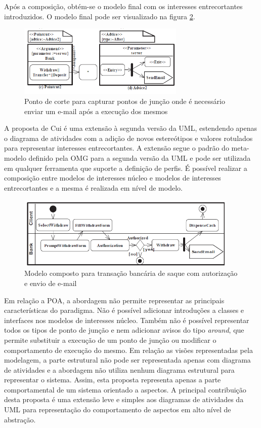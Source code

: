 Após a composição, obtém-se o modelo final com os interesses entrecortantes introduzidos. O modelo final pode ser visualizado na figura
\ref{fig:withdraw_final}.

\begin{figure}[!t]
	\centering
	\includegraphics[width=300px]{img/withdraw_2.png}
	\caption{Ponto de corte para capturar pontos de junção onde é necessário
	enviar um e-mail após a execução dos mesmos}\label{fig:withdraw_2}
\end{figure}

A proposta de Cui é uma extensão à segunda versão da UML, estendendo apenas o diagrama de atividades com a adição de novos estereótipos e valores
rotulados para representar interesses entrecortantes. A extensão segue o padrão do meta-modelo definido pela OMG para a segunda versão da UML e 
pode ser utilizada em qualquer ferramenta que suporte a definição de perfis. É possível realizar a composição entre modelos de interesses núcleo e
modelos de interesses entrecortantes e a mesma é realizada em nível de modelo.

\begin{figure}
	\centering
	\includegraphics[width=400px]{img/withdraw_final.png}
	\caption{Modelo composto para transação bancária de
	saque com autorização e envio de e-mail}\label{fig:withdraw_final}
\end{figure}

Em relação a POA, a abordagem não permite representar as principais características do paradigma. Não é possível adicionar introduções a classes e
interfaces nos modelos de interesses núcleo. Também não é possível representar todos os tipos de ponto de junção e nem adicionar avisos do tipo \textit{around}, que permite
substituir a execução de um ponto de junção ou modificar o comportamento de execução do mesmo. Em relação as visões representadas pela modelagem, a
parte estrutural não pode ser representada apenas com diagrama de atividades e a abordagem não utiliza nenhum diagrama estrutural para representar o
sistema. Assim, esta proposta representa apenas a parte comportamental de um sistema orientado a aspectos. A principal contribuição desta proposta é
uma extensão leve e simples aos diagramas de atividades da UML para representação do comportamento de aspectos em alto nível de abstração.


